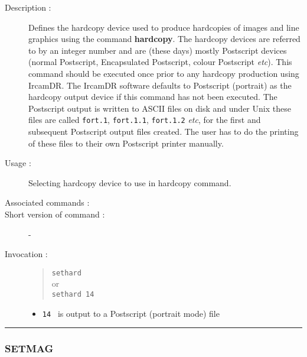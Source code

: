 \begin{description}

\item[Description :] Defines the hardcopy device used to produce
hardcopies of images and line graphics using the command {\bf hardcopy}.  The
hardcopy devices are referred to by an integer number and are (these
days) mostly Postscript devices (normal Postscript, Encapsulated
Postscript, colour Postscript \emph{etc}).  This command should be
executed once prior to any hardcopy production using {\sc IrcamDR}.
The {\sc IrcamDR} software defaults to Postscript (portrait) as the
hardcopy output device if this command has not been executed.  The
Postscript output is written to ASCII files on disk and under Unix
these files are called {\tt fort.1}, {\tt fort.1.1}, {\tt fort.1.2}
\emph{etc}, for the first and subsequent Postscript output files
created.  The user has to do the printing of these files to their own
Postscript printer manually.

\item[Usage :] Selecting hardcopy device to use in hardcopy command.
\item[Associated commands :] {\tt {}}
\item[Short version of command :] -
\item[Invocation :]

\begin{quote}{\tt  sethard }\\
or \\
{\tt sethard 14 }
\end{quote}

\begin{itemize}

\item {\tt 14 } is output to a Postscript (portrait mode) file
\end{itemize}

\end{description}

\hrule
\subsubsection*{\label{SETMAG}SETMAG}

